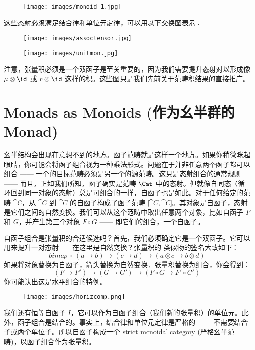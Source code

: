 \begin{figure}[H]
  \centering
  \texttt{[image: images/monoid-1.jpg]}
\end{figure}

\noindent
这些态射必须满足结合律和单位元定律，可以用以下交换图表示：

\begin{figure}[H]
  \centering
  \texttt{[image: images/assoctensor.jpg]}
\end{figure}

\begin{figure}[H]
  \centering
  \texttt{[image: images/unitmon.jpg]}
\end{figure}

\noindent
注意，张量积必须是一个双函子是至关重要的，因为我们需要提升态射对以形成像 $\mu \otimes \id$ 或 $\eta \otimes \id$ 这样的积。这些图只是我们先前关于范畴积结果的直接推广。

\section{Monads as Monoids (作为幺半群的 Monad)}

幺半结构会出现在意想不到的地方。函子范畴就是这样一个地方。如果你稍微眯起眼睛，你可能会将函子组合视为一种乘法形式。问题在于并非任意两个函子都可以组合 —— 一个的目标范畴必须是另一个的源范畴。这只是态射组合的通常规则 —— 而且，正如我们所知，函子确实是范畴 $\Cat$ 中的态射。但就像自同态（循环回到同一对象的态射）总是可组合的一样，自函子也是如此。对于任何给定的范畴 $\cat{C}$，从 $\cat{C}$ 到 $\cat{C}$ 的自函子构成了函子范畴 ${[}\cat{C}, \cat{C}{]}$。其对象是自函子，态射是它们之间的自然变换。我们可以从这个范畴中取出任意两个对象，比如自函子 $F$ 和 $G$，并产生第三个对象 $F \circ G$ —— 即它们的组合，一个自函子。

自函子组合是张量积的合适候选吗？首先，我们必须确定它是一个双函子。它可以用来提升一对态射——在这里是自然变换？张量积的  类似物的签名大致如下：
\[\mathit{bimap} \Colon (a \to b) \to (c \to d) \to (a \otimes c \to b \otimes d)\]
如果将对象替换为自函子，箭头替换为自然变换，张量积替换为组合，你会得到：
\[(F \to F') \to (G \to G') \to (F \circ G \to F' \circ G')\]
你可能认出这是水平组合的特例。

\begin{figure}[H]
  \centering
  \texttt{[image: images/horizcomp.png]}
\end{figure}

\noindent
我们还有恒等自函子 $I$，它可以作为自函子组合（我们新的张量积）的单位元。此外，函子组合是结合的。事实上，结合律和单位元定律是严格的 —— 不需要结合子或两个单位子。所以自函子构成一个 strict monoidal category (严格幺半范畴)，以函子组合作为张量积。

